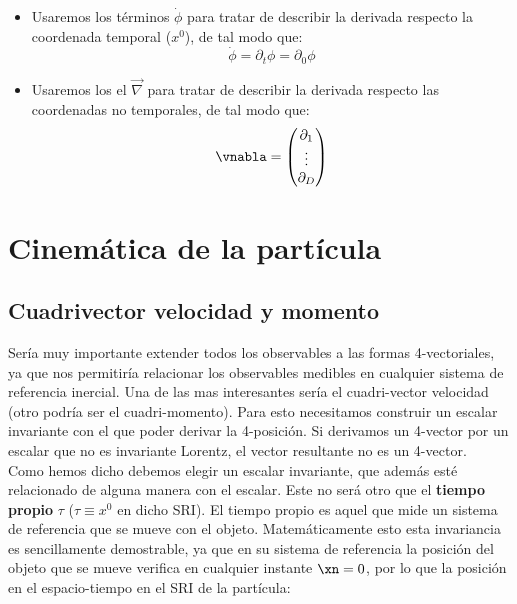 \begin{itemize}
    \item Usaremos los términos $\dot{\phi}$ para tratar de describir la derivada respecto la coordenada temporal ($x^0$), de tal modo que:
    \begin{equation}
        \dot{\phi} = \partial_t \phi = \partial_0 \phi
    \end{equation}  
    \item Usaremos los el $\vec{\nabla}$ para tratar de describir la derivada respecto las coordenadas no temporales, de tal modo que:
    \begin{equation}
        \vnabla = \begin{pmatrix}
            \partial_1 \\
            \vdots \\ \partial_D
        \end{pmatrix}
    \end{equation}
\end{itemize}




\section*{Cinemática de la partícula}
\subsection*{Cuadrivector velocidad y momento}

Sería muy importante extender todos los observables a las formas 4-vectoriales, ya que nos permitiría relacionar los observables medibles en cualquier sistema de referencia inercial. Una de las mas interesantes sería el cuadri-vector velocidad (otro podría ser el cuadri-momento). Para esto necesitamos construir un escalar invariante con el que poder derivar la 4-posición. Si derivamos un 4-vector por un escalar que no es invariante Lorentz, el vector resultante no es un 4-vector. \\

Como hemos dicho debemos elegir un escalar invariante, que además esté relacionado de alguna manera con el escalar. Este no será otro que el \textbf{tiempo propio} $\tau $ ($\tau \equiv x^0$ en dicho SRI). El tiempo propio es aquel que mide un sistema de referencia que se mueve con el objeto. Matemáticamente esto esta invariancia es sencillamente demostrable, ya que en su sistema de referencia la posición del objeto que se mueve verifica en cualquier instante $\xn=0$, por lo que la posición en el espacio-tiempo en el SRI de la partícula:

